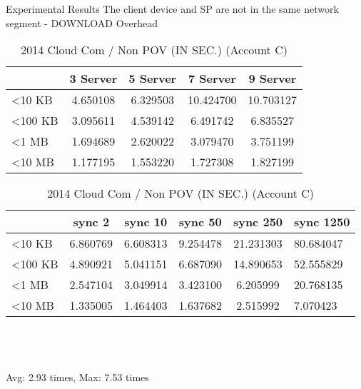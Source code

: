 \begin{frame}{Experimental Results}
{The client device and SP are \alert{not} in the same network segment - DOWNLOAD Overhead}
	\scriptsize
    \begin{table}[]
    \centering
    \caption{My Method / Non POV (IN SEC.) (Account C)}
    \begin{tabular}{lcccc}
                         & 3 Server & 5 Server & 7 Server  & 9 Server  \\ \hline
        \textless 10 KB  & 4.650108 & 6.329503 & 10.424700 & 10.703127 \\ \hline
        \textless 100 KB & 3.095611 & 4.539142 & 6.491742  & 6.835527  \\ \hline
        \textless 1 MB   & 1.694689 & 2.620022 & 3.079470  & 3.751199  \\ \hline
        \textless 10 MB  & 1.177195 & 1.553220 & 1.727308  & 1.827199  \\ \hline
    \end{tabular}
    \caption{2014 Cloud Com / Non POV (IN SEC.) (Account C)}
    \begin{tabular}{lccccl}
                         & sync 2   & sync 10  & sync 50  & sync 250  & sync 1250 \\ \hline
        \textless 10 KB  & 6.860769 & 6.608313 & 9.254478 & 21.231303 & 80.684047 \\ \hline
        \textless 100 KB & 4.890921 & 5.041151 & 6.687090 & 14.890653 & 52.555829 \\ \hline
        \textless 1 MB   & 2.547104 & 3.049914 & 3.423100 & 6.205999  & 20.768135 \\ \hline
        \textless 10 MB  & 1.335005 & 1.464403 & 1.637682 & 2.515992  & 7.070423  \\ \hline
    \end{tabular}
    ~\\
    ~\\
    ~\\
    \alert{Avg: 2.93 times, Max: 7.53 times}
    \end{table}
\end{frame}